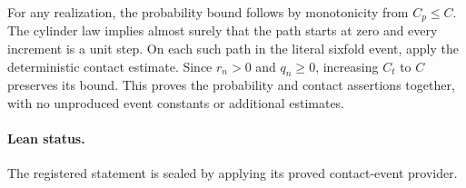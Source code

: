 For any realization, the probability bound follows by monotonicity from
$C_p\leq C$. The cylinder law implies almost surely that the path starts
at zero and every increment is a unit step. On each such path in the
literal sixfold event, apply the deterministic contact estimate. Since
$r_n>0$ and $q_n\geq0$, increasing $C_t$ to $C$ preserves its bound.
This proves the probability and contact assertions together, with no
unproduced event constants or additional estimates.
\paragraph{Lean status.}
The registered statement is sealed by applying its proved contact-event provider.
